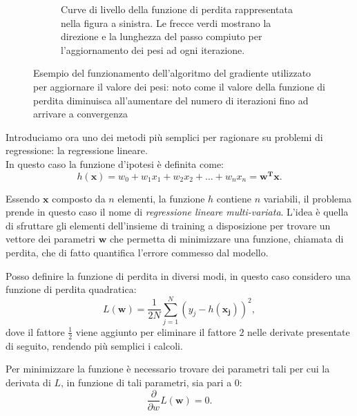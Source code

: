\documentclass[../../main.tex]{subfiles}
\begin{document}
\begin{figure}[H]
\begin{subfigure}[t]{0.49\textwidth}
            \caption{Curve di livello della funzione di perdita rappresentata nella figura a sinistra. Le frecce verdi mostrano la direzione e la lunghezza del passo compiuto per l'aggiornamento dei pesi ad ogni iterazione.}
            \label{fig:curveLivello}      
        \end{subfigure}
        \caption{Esempio del funzionamento dell'algoritmo del gradiente utilizzato per aggiornare il valore dei pesi: noto come il valore della funzione di perdita diminuisca all'aumentare del numero di iterazioni fino ad arrivare a convergenza}
        \label{fig:gradient_descent}
    \end{figure}

    Introduciamo ora uno dei metodi più semplici per ragionare su problemi di regressione: la regressione lineare.\\
    In questo caso la funzione d'ipotesi è definita come:
    \begin{equation}
        h(\boldsymbol{x}) = w_0 + w_1x_1 + w_2x_2 + \dots + w_nx_n = \boldsymbol{w^T x}.
        \label{eqn:linearhypotes}   
    \end{equation}

    Essendo $\boldsymbol{x}$  composto da $n$ elementi, la funzione $h$ contiene $n$ variabili, il problema prende in questo caso il nome di \textit{regressione lineare multi-variata}. L'idea è quella di sfruttare gli elementi dell'insieme di training a disposizione per trovare un vettore dei parametri $\boldsymbol{w}$ che permetta di minimizzare  una funzione, chiamata di perdita, che di fatto quantifica l'errore commesso dal modello.
    
    Posso definire la funzione di perdita in diversi modi, in questo caso considero una funzione di perdita quadratica:
    \begin{equation}
        L(\boldsymbol{w}) = \frac{1}{2N} \sum_{j=1}^N(y_j - h(\boldsymbol{x_j}))^2,
        \label{eqn:lossquadratica}
    \end{equation}
    dove il fattore $\frac{1}{2}$ viene aggiunto per eliminare il fattore $2$ nelle derivate presentate di seguito, rendendo più semplici i calcoli.

    Per minimizzare la funzione è necessario trovare dei parametri tali per cui la derivata di $L$, in funzione di tali parametri, sia pari a 0:
    \[\frac{\partial}{\partial w} L(\boldsymbol{w}) = 0.\]
\end{document}

